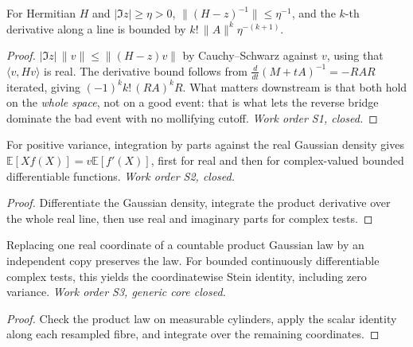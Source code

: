 \begin{lemma}\label{lem:envelope}
  \leanok
  For Hermitian $H$ and $|\Im z|\ge\eta>0$, $\|(H-z)^{-1}\|\le\eta^{-1}$, and the
  $k$-th derivative along a line is bounded by $k!\,\|A\|^k\eta^{-(k+1)}$.
\end{lemma}
\begin{proof}\leanok
  $|\Im z|\,\|v\|\le\|(H-z)v\|$ by Cauchy--Schwarz against $v$, using that
  $\langle v,Hv\rangle$ is real.  The derivative bound follows from
  $\frac{d}{dt}(M+tA)^{-1}=-RAR$ iterated, giving $(-1)^kk!\,(RA)^kR$.
  What matters downstream is that both hold on the \emph{whole space}, not on a
  good event: that is what lets the reverse bridge dominate the bad event with no
  mollifying cutoff.  \emph{Work order S1, closed.}
\end{proof}

\begin{lemma}\label{lem:stein-scalar}
  \leanok
  For positive variance, integration by parts against the real Gaussian density
  gives $\mathbb E[Xf(X)]=v\mathbb E[f'(X)]$, first for real and then for
  complex-valued bounded differentiable functions.  \emph{Work order S2, closed.}
\end{lemma}
\begin{proof}\leanok
  Differentiate the Gaussian density, integrate the product derivative over
  the whole real line, then use real and imaginary parts for complex tests.
\end{proof}

\begin{lemma}\label{lem:stein-product}
  \leanok
  Replacing one real coordinate of a countable product Gaussian law by an
  independent copy preserves the law.  For bounded continuously differentiable
  complex tests, this yields the coordinatewise Stein identity, including
  zero variance.  \emph{Work order S3, generic core closed.}
\end{lemma}
\begin{proof}\leanok
  Check the product law on measurable cylinders, apply the scalar identity
  along each resampled fibre, and integrate over the remaining coordinates.
\end{proof}

